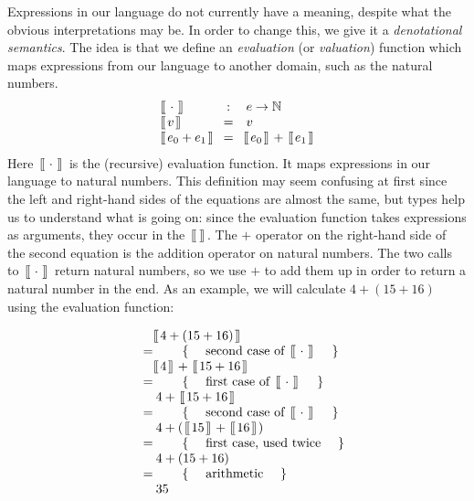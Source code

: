 \documentclass[10pt,a4paper,fleqn]{exam}
\newcommand {\lbrac} {\makebox[0pt]{[\kern-1ex[}}
\newcommand {\rbrac} {\makebox[0pt]{]\kern-1ex]}}
\newcommand{\denote}[1]{\lbrac~#1~\rbrac}
\begin{document}
\begin{questions}
\question Expressions in our language do not currently have a meaning, despite what the obvious interpretations may be. In order to change this, we give it a \emph{denotational semantics}. The idea is that we define an \emph{evaluation} (or \emph{valuation}) function which maps expressions from our language to another domain, such as the natural numbers.
\begin{displaymath}
\begin{array}{lcl}
\denote{\cdot} & : & e \to \mathbb{N}\\
\denote{v} & = & v \\
\denote{e_0 + e_1} & = & \denote{e_0}~ + ~\denote{e_1}
\end{array}
\end{displaymath}
Here $~\denote{\cdot}~$ is the (recursive) evaluation function. It maps expressions in our language to natural numbers. This definition may seem confusing at first since the left and right-hand sides of the equations are almost the same, but types help us to understand what is going on: since the evaluation function takes expressions as arguments, they occur in the $~\denote{}~$. The $+$ operator on the right-hand side of the second equation is the addition operator on natural numbers. The two calls to $~\denote{\cdot}~$ return natural numbers, so we use $+$ to add them up in order to return a natural number in the end. As an example, we will calculate $4 + (15 + 16)$ using the evaluation function:

\begin{displaymath}
\begin{array}{cl}
\expr{\denote{4 + (15 + 16)}} 
\hint{second case of $~\denote{\cdot}~$}
\expr{\denote{4}~ + ~\denote{15 + 16}}
\hint{first case of $~\denote{\cdot}~$}
\expr{4 + ~\denote{15 + 16}}
\hint{second case of $~\denote{\cdot}~$}
\expr{4 + (~\denote{15}~+~\denote{16}~)}
\hint{first case, used twice}
\expr{4 + (15 + 16)}
\hint{arithmetic}
\expr{35}
\end{array}
\end{displaymath}
\begin{parts}

\end{parts}
\end{questions}
\end{document}
